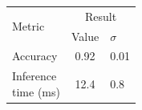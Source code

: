 \begin{table}[htbp]
\centering
\begin{tabular}{lcl}
\toprule
\multirow{2}{*}{Metric} & \multicolumn{2}{c}{Result} \\
\cmidrule(lr){2-3}
 & Value & $\sigma$ \\
\midrule
Accuracy & 0.92 & 0.01 \\
\makecell{Inference \\ time (ms)} & 12.4 & 0.8 \\
\bottomrule
\end{tabular}
\end{table}
